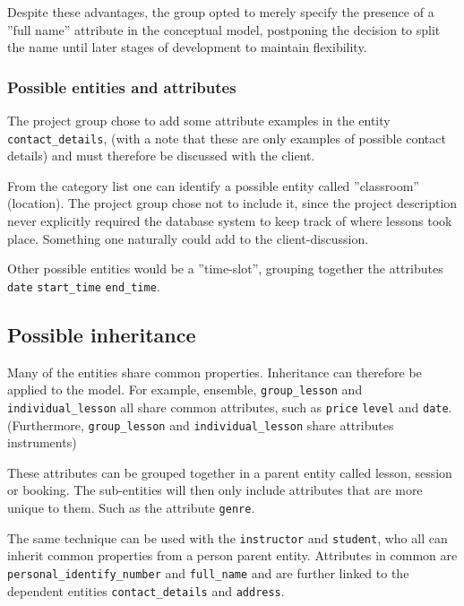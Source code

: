 \documentclass[a4paper]{scrartcl}
\begin{document}
Despite these advantages, the group opted to merely specify the presence of a
''full name'' attribute in the conceptual model, postponing the decision to split
the name until later stages of development to maintain flexibility.

\subsubsection*{Possible entities and attributes}
The project group chose to add some attribute examples in the entity 
\verb|contact_details|,
(with a note that these
are only examples of possible contact details) and 
must therefore be discussed 
with the client. 

From the category list one can identify a possible entity
called ''classroom'' (location).
The project group chose not to include it, 
since the project description never explicitly required 
the database system to keep track of where lessons took place.
Something one naturally could add to the client-discussion. 

Other possible entities would be a ''time-slot'', grouping 
together the attributes
\verb|date|
\verb|start_time|
\verb|end_time|.

\subsection*{Possible inheritance}
Many of the entities share common properties. 
Inheritance can therefore be applied to the model. 
For example, 
ensemble, 
\verb|group_lesson| and 
\verb|individual_lesson| 
all share common attributes, such as 
\verb|price|
\verb|level| and 
\verb|date|. 
(Furthermore, 
\verb|group_lesson| and 
\verb|individual_lesson| share attributes instruments)

These attributes can be grouped together
in a parent entity called lesson, session or booking. 
The sub-entities will then only include attributes that are more
unique to them. 
Such as the attribute
\verb|genre|.

The same technique can be used with the 
\verb|instructor| and 
\verb|student|,
who all can inherit common properties from a 
person 
parent entity. 
Attributes in common are 
\verb|personal_identify_number| and 
\verb|full_name| 
and are further linked to the dependent entities 
\verb|contact_details|
and 
\verb|address|.

\end{document}
